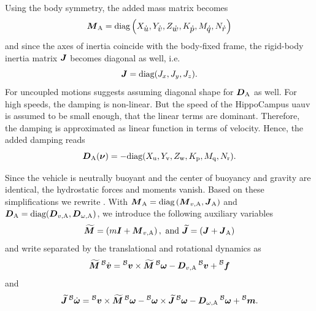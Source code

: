 Using the body symmetry, the added mass matrix becomes 
\begin{equation}
	\mbox{$\bm{M}$}_\text{A} =
	\text{diag}\left(X_{\mbox{$\dot{u}$}}, Y_{\mbox{$\dot{v}$}}, Z_{\mbox{$\dot{w}$}}, K_{\mbox{$\dot{p}$}}, M_{\mbox{$\dot{q}$}}, N_{\mbox{$\dot{r}$}}\right)
\end{equation}
and since the axes of inertia coincide with the body-fixed frame, the rigid-body inertia matrix $\mbox{$\bm{J}$}$ becomes diagonal as well, i.e.
\begin{equation}
	\mbox{$\bm{J}$} = \text{diag}(J_x, J_y, J_z)
	.
\end{equation}
For uncoupled motions \cite{Fossen11} suggests assuming diagonal shape for $\mbox{$\bm{D}$}_\text{A}$ as well. For high speeds, the damping is non-linear. But the speed of the HippoCampus \ac{uauv} is assumed to be small enough, that the linear terms are dominant. Therefore, the damping is approximated as linear function in terms of velocity.
Hence, the added damping reads
\begin{equation}
	\mbox{$\bm{D}$}_\text{A}(\mbox{$\bm{\nu}$}) = -\text{diag}(X_\text{u}, Y_\text{v}, Z_\text{w}, K_\text{p}, M_\text{q}, N_\text{r})
	.
\end{equation}

Since the vehicle is neutrally buoyant and the center of buoyancy and gravity are identical, the hydrostatic forces and moments vanish. Based on these simplifications we rewrite . With $\mbox{$\bm{M}$}_\text{A} = \text{diag}\left(\mbox{$\bm{M}$}_{v, \text{A}}, \mbox{$\bm{J}$}_\text{A}\right)$ and $\mbox{$\bm{D}$}_\text{A} = \text{diag}(\mbox{$\bm{D}$}_{v,\text{A}}, \mbox{$\bm{D}$}_{\omega,\text{A}})$, we introduce the following auxiliary variables
\begin{equation}
	\mbox{$\widetilde{\bm{M}}$} = \left(m\mbox{$\bm{I}$} + \mbox{$\bm{M}$}_{v, \text{A}}\right),\text{ and }
	\mbox{$\widetilde{\bm{J}}$} = \left(\mbox{$\bm{J}$} + \mbox{$\bm{J}$}_\text{A}\right)
\end{equation}
and write  separated by the translational and rotational dynamics as
\begin{equation}
	\label{eq:equation-of-motion-translational}
	\Mbs \vlinbodydot =
	\vlinbody \times \Mbs \vangbody
	-\Dvadded \vlinbody
	+ \prescript{\mathcal{B}}{}{\fb}
\end{equation}
and
\begin{equation}
	\label{eq:equation-of-motion-rotational}
	\Jbs \vangbodydot =
	\vlinbody \times \Mbs \vangbody
	- \vangbody \times \Jbs \vangbody
	- \Domegaadded \vangbody
	+ \prescript{\mathcal{B}}{}{\mb}
	.
\end{equation}


